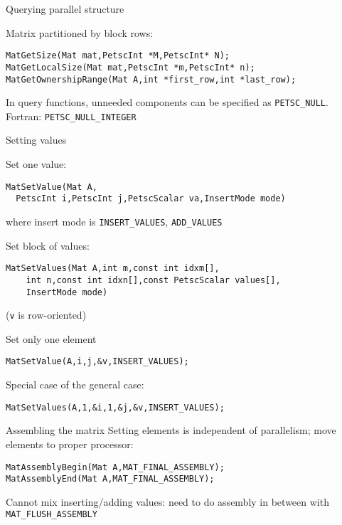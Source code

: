 \begin{numberedframe}{Querying parallel structure}

Matrix partitioned by block rows:
\begin{lstlisting}
MatGetSize(Mat mat,PetscInt *M,PetscInt* N);
MatGetLocalSize(Mat mat,PetscInt *m,PetscInt* n);
MatGetOwnershipRange(Mat A,int *first_row,int *last_row);
\end{lstlisting}
 In query functions, unneeded components can be specified as
 \lstinline{PETSC_NULL}.\\
 Fortran: \lstinline{PETSC_NULL_INTEGER}
\end{numberedframe}

\begin{numberedframe}{Setting values}

Set one value:
\begin{lstlisting}
MatSetValue(Mat A,
  PetscInt i,PetscInt j,PetscScalar va,InsertMode mode)
\end{lstlisting}
where insert mode is \lstinline{INSERT_VALUES}, \lstinline{ADD_VALUES}

Set block of values:
\begin{lstlisting}
MatSetValues(Mat A,int m,const int idxm[],
    int n,const int idxn[],const PetscScalar values[],
    InsertMode mode)
\end{lstlisting}
(\lstinline{v} is row-oriented)
\end{numberedframe}

\begin{numberedframe}{Set only one element}
\begin{lstlisting}
MatSetValue(A,i,j,&v,INSERT_VALUES);
\end{lstlisting}
Special case of the general case:
\begin{lstlisting}
MatSetValues(A,1,&i,1,&j,&v,INSERT_VALUES);
\end{lstlisting}
\end{numberedframe}

\begin{numberedframe}{Assembling the matrix}
Setting elements is independent of parallelism; move elements to
proper processor:
\begin{lstlisting}
MatAssemblyBegin(Mat A,MAT_FINAL_ASSEMBLY);
MatAssemblyEnd(Mat A,MAT_FINAL_ASSEMBLY);
\end{lstlisting}

Cannot mix inserting/adding values: need to do assembly in between
with \lstinline{MAT_FLUSH_ASSEMBLY}
\end{numberedframe}

